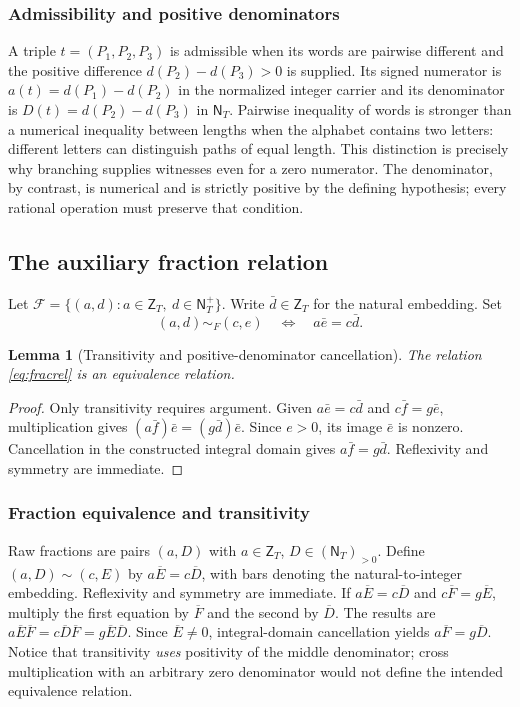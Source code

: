 \documentclass[11pt,reqno]{amsart}
\newtheorem{lemma}[theorem]{Lemma}
\theoremstyle{definition}\newtheorem{definition}[theorem]{Definition}
\theoremstyle{remark}\newtheorem{remark}[theorem]{Remark}
\newcommand{\N}{\mathsf N_T}\newcommand{\Z}{\mathsf Z_T}\newcommand{\Q}{\mathsf Q_T}\newcommand{\RR}{\mathsf R}
\begin{document}
\medskip
\subsubsection*{Admissibility and positive denominators}\label{supp:6-1}
A triple $t=(P_1,P_2,P_3)$ is admissible when its words are pairwise different and the positive difference $d(P_2)-d(P_3)>0$ is supplied. Its signed numerator is $a(t)=d(P_1)-d(P_2)$ in the normalized integer carrier and its denominator is $D(t)=d(P_2)-d(P_3)$ in $\N$. Pairwise inequality of words is stronger than a numerical inequality between lengths when the alphabet contains two letters: different letters can distinguish paths of equal length. This distinction is precisely why branching supplies witnesses even for a zero numerator. The denominator, by contrast, is numerical and is strictly positive by the defining hypothesis; every rational operation must preserve that condition.
\medskip

\subsection{The auxiliary fraction relation}\label{main:sub-15}
Let $\mathcal F=\{(a,d):a\in\Z,\ d\in\N^{+}\}$. Write $\bar d\in\Z$ for the natural embedding. Set
\begin{equation}\label{eq:fracrel}
(a,d)\sim_F(c,e)\quad\Longleftrightarrow\quad a\bar e=c\bar d.
\end{equation}
\begin{lemma}[Transitivity and positive-denominator cancellation]\label{lem:fractionrel}
The relation \eqref{eq:fracrel} is an equivalence relation.
\end{lemma}
\begin{proof}
Only transitivity requires argument. Given $a\bar e=c\bar d$ and $c\bar f=g\bar e$, multiplication gives $(a\bar f)\bar e=(g\bar d)\bar e$. Since $e>0$, its image $\bar e$ is nonzero. Cancellation in the constructed integral domain gives $a\bar f=g\bar d$. Reflexivity and symmetry are immediate.
\end{proof}


\medskip
\subsubsection*{Fraction equivalence and transitivity}\label{supp:6-2}
Raw fractions are pairs $(a,D)$ with $a\in\Z$, $D\in(\N)_{>0}$. Define $(a,D)\sim(c,E)$ by $a\overline E=c\overline D$, with bars denoting the natural-to-integer embedding. Reflexivity and symmetry are immediate. If $a\overline E=c\overline D$ and $c\overline F=g\overline E$, multiply the first equation by $\overline F$ and the second by $\overline D$. The results are $a\overline E\overline F=c\overline D\overline F=g\overline E\overline D$. Since $\overline E\ne0$, integral-domain cancellation yields $a\overline F=g\overline D$. Notice that transitivity \emph{uses} positivity of the middle denominator; cross multiplication with an arbitrary zero denominator would not define the intended equivalence relation.
\medskip
\end{document}
